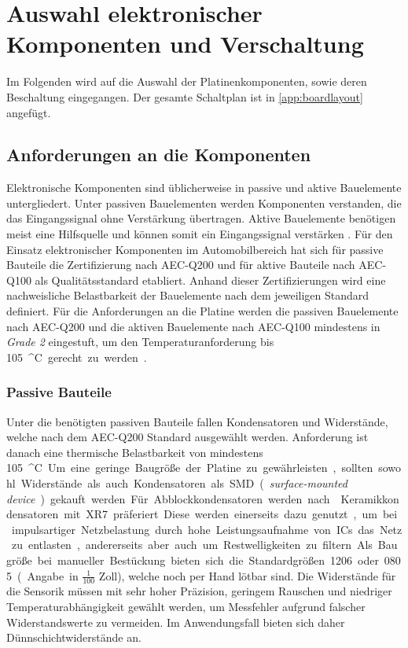 \chapter{Auswahl elektronischer Komponenten und Verschaltung}\label{ch:komp}
Im Folgenden wird auf die Auswahl der Platinenkomponenten, sowie deren Beschaltung eingegangen. Der gesamte Schaltplan ist in \autoref{app:boardlayout} angefügt.
\section{Anforderungen an die Komponenten}
Elektronische Komponenten sind üblicherweise in passive und aktive Bauelemente untergliedert. Unter passiven Bauelementen werden Komponenten verstanden, die das Eingangssignal ohne Verstärkung übertragen. Aktive Bauelemente benötigen meist eine Hilfsquelle und können somit ein Eingangssignal verstärken \cite[S.25]{haendschke}. Für den Einsatz elektronischer Komponenten im Automobilbereich hat sich für passive Bauteile die Zertifizierung nach AEC-Q200 und für aktive Bauteile nach AEC-Q100 als Qualitätsstandard etabliert. Anhand dieser Zertifizierungen wird eine nachweisliche Belastbarkeit der Bauelemente nach dem jeweiligen Standard definiert. Für die Anforderungen an die Platine werden die passiven Bauelemente nach AEC-Q200 und die aktiven Bauelemente nach AEC-Q100 mindestens in \textit{Grade 2} eingestuft, um den Temperaturanforderung bis \SI{105}{^\circ C} gerecht zu werden \cite[S.6]{aecq}. 
\subsection{Passive Bauteile}
Unter die benötigten passiven Bauteile fallen Kondensatoren und Widerstände, welche nach dem AEC-Q200 Standard ausgewählt werden. Anforderung ist danach eine thermische Belastbarkeit von mindestens \SI{105}{^\circ C}. Um eine geringe Baugröße der Platine zu gewährleisten, sollten sowohl Widerstände als auch Kondensatoren als SMD (\textit{surface-mounted device}) gekauft werden. Für Abblockkondensatoren werden nach \cite[S.7]{ldo} Keramikkondensatoren mit XR7 präferiert. Diese werden einerseits dazu genutzt, um bei impulsartiger Netzbelastung durch hohe Leistungsaufnahme von ICs das Netz zu entlasten, andererseits aber auch um Restwelligkeiten zu filtern. Als Baugröße bei manueller Bestückung bieten sich die Standardgrößen 1206 oder 0805 (Angabe in $\frac{1}{100}$ Zoll), welche noch per Hand lötbar sind. Die Widerstände für die Sensorik müssen mit sehr hoher Präzision, geringem Rauschen und niedriger Temperaturabhängigkeit gewählt werden, um Messfehler aufgrund falscher Widerstandswerte zu vermeiden. Im Anwendungsfall bieten sich daher Dünnschichtwiderstände an.
